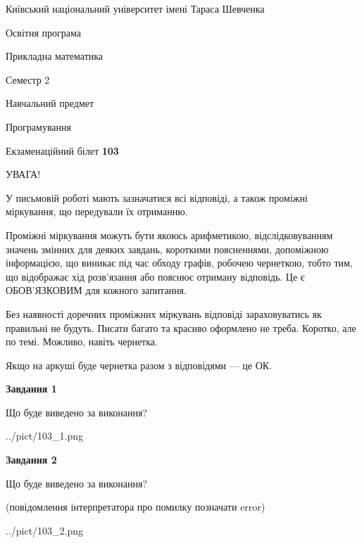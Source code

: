 \documentclass[12pt, ukrainian]{article}
\begin{document}
{{\begin {small}\par
{ \center  Київський національний університет імені Тараса Шевченка \par}
{\parbox {5 cm}{Освітня програма \hfill}{\parbox {7 cm}{Прикладна математика\hfill}}\parbox {6 cm}{\hfill Семестр 2}}\par
{\parbox {5 cm} {Навчальний предмет \hfill}\parbox {7 cm}{Програмування \hfill}\parbox {6cm}{\hfill}\par}\vspace{-7pt} \end{small}}{\center Екзаменаційний білет \No \textbf
{ 103 }\par}}
{
\begin {large}
УВАГА!

У письмовій роботі мають зазначатися всі відповіді, а також проміжні міркування, що передували їх отриманню.

Проміжні міркування можуть бути якоюсь арифметикою, відслідковуванням зна\-чень змінних для деяких завдань,
короткими поясненнями, допоміжною інформацією, що виникає під час обходу графів, робочею чернеткою,
тобто тим, що відображає хід розв’язання або пояснює отриману відповідь.
Це є ОБОВ’ЯЗКОВИМ для кожного запитання.

Без наявності доречних проміжних міркувань відповіді зараховуватись як правиль\-ні не будуть.
Писати багато та красиво оформлено не треба. Коротко, але по темі. Можли\-во, навіть чернетка.

Якщо на аркуші буде чернетка разом з відповідями --- це ОК.

\newpage

{\begin {center}\textbf{Завдання 1}\end {center}}\par
Що буде виведено за виконання?\par
\begin{center}
	{../pict/103_1.png}
\end{center}
\newpage

{\begin {center}\textbf{Завдання 2}\end {center}}\par
Що буде виведено за виконання?\par
 (повідомлення інтерпретатора про помилку позначати error)\par
\begin{center}
	{../pict/103_2.png}
\end{center}
\newpage


\end{large}}
\end{document}
